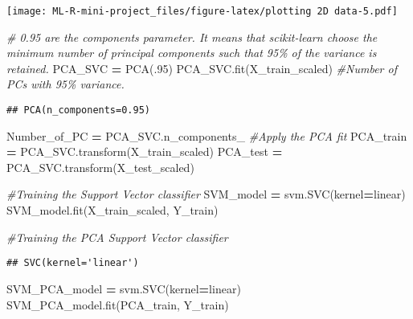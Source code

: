 \documentclass[
]{article}
\newenvironment{Shaded}{\begin{snugshade}}{\end{snugshade}}
\newcommand{\CommentTok}[1]{\textcolor[rgb]{0.56,0.35,0.01}{\textit{#1}}}
\newcommand{\FloatTok}[1]{\textcolor[rgb]{0.00,0.00,0.81}{#1}}
\newcommand{\NormalTok}[1]{#1}
\newcommand{\OperatorTok}[1]{\textcolor[rgb]{0.81,0.36,0.00}{\textbf{#1}}}
\newcommand{\StringTok}[1]{\textcolor[rgb]{0.31,0.60,0.02}{#1}}
\begin{document}
\texttt{[image: ML-R-mini-project\_files/figure-latex/plotting 2D data-5.pdf]}

\begin{Shaded}
\begin{Highlighting}[]
\CommentTok{\# 0.95 are the components parameter. It means that scikit{-}learn choose the minimum number of principal components such that 95\% of the variance is retained.}
\NormalTok{PCA\_SVC }\OperatorTok{=}\NormalTok{ PCA(}\FloatTok{.95}\NormalTok{)}
\NormalTok{PCA\_SVC.fit(X\_train\_scaled)}
\CommentTok{\#Number of PC\textquotesingle{}s with 95\% variance.}
\end{Highlighting}
\end{Shaded}

\begin{verbatim}
## PCA(n_components=0.95)
\end{verbatim}

\begin{Shaded}
\begin{Highlighting}[]
\NormalTok{Number\_of\_PC }\OperatorTok{=}\NormalTok{ PCA\_SVC.n\_components\_}
\CommentTok{\#Apply the PCA fit}
\NormalTok{PCA\_train }\OperatorTok{=}\NormalTok{ PCA\_SVC.transform(X\_train\_scaled)}
\NormalTok{PCA\_test }\OperatorTok{=}\NormalTok{ PCA\_SVC.transform(X\_test\_scaled)}
\end{Highlighting}
\end{Shaded}

\begin{Shaded}
\begin{Highlighting}[]
\CommentTok{\#Training the Support Vector classifier }
\NormalTok{SVM\_model }\OperatorTok{=}\NormalTok{ svm.SVC(kernel}\OperatorTok{=}\StringTok{\textquotesingle{}linear\textquotesingle{}}\NormalTok{)}
\NormalTok{SVM\_model.fit(X\_train\_scaled, Y\_train)}

\CommentTok{\#Training the PCA Support Vector classifier }
\end{Highlighting}
\end{Shaded}

\begin{verbatim}
## SVC(kernel='linear')
\end{verbatim}

\begin{Shaded}
\begin{Highlighting}[]
\NormalTok{SVM\_PCA\_model }\OperatorTok{=}\NormalTok{ svm.SVC(kernel}\OperatorTok{=}\StringTok{\textquotesingle{}linear\textquotesingle{}}\NormalTok{)}
\NormalTok{SVM\_PCA\_model.fit(PCA\_train, Y\_train)}
\end{Highlighting}
\end{Shaded}
\end{document}

